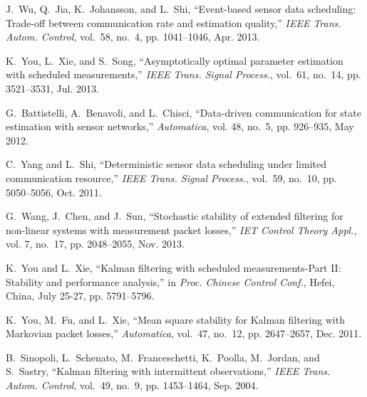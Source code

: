 \documentclass[journal]{IEEEtran}
\begin{document}
\begin{thebibliography}{10}
J.~Wu, Q.~Jia, K.~Johansson, and L.~Shi, ``Event-based sensor data scheduling:
  Trade-off between communication rate and estimation quality,''
  \emph{IEEE Trans. Autom. Control}, vol.~58, no.~4, pp.
  1041--1046, Apr. 2013.

K.~You, L.~Xie, and S.~Song, ``Asymptotically optimal parameter estimation with
  scheduled measurements,'' \emph{IEEE Trans. Signal Process.},
  vol.~61, no.~14, pp. 3521--3531, Jul. 2013.

G.~Battistelli, A.~Benavoli, and L.~Chisci, ``Data-driven communication for
  state estimation with sensor networks,'' \emph{Automatica}, vol. 48, no.~5, pp. 926--935, May 2012.

C.~Yang and L.~Shi, ``Deterministic sensor data scheduling under limited
  communication resource,'' \emph{IEEE Trans. Signal Process.},
  vol.~59, no.~10, pp. 5050--5056, Oct. 2011.

G.~Wang, J.~Chen, and J.~Sun, ``Stochastic stability of extended filtering for non-linear systems with measurement packet losses,''
\emph{IET Control Theory Appl.}, vol. 7, no.~17, pp. 2048--2055, Nov. 2013.

K.~You and L.~Xie, ``Kalman filtering with scheduled measurements-Part II:
Stability and performance analysis,'' in \emph{Proc. Chinese Control Conf.}, Hefei, China, July 25-27, pp. 5791--5796.


K.~You, M.~Fu, and L.~Xie, ``Mean square stability for Kalman filtering with Markovian packet losses,'' \emph{Automatica}, vol.~47, no.~12, pp. 2647--2657, Dec. 2011.

\newpage

B.~Sinopoli, L.~Schenato, M.~Franceschetti, K.~Poolla, M.~Jordan, and
  S.~Sastry, ``Kalman filtering with intermittent observations,''
  \emph{IEEE Trans. Autom. Control}, vol.~49, no.~9, pp.
  1453--1464, Sep. 2004.

{}

{}



\end{thebibliography}
\end{document}
